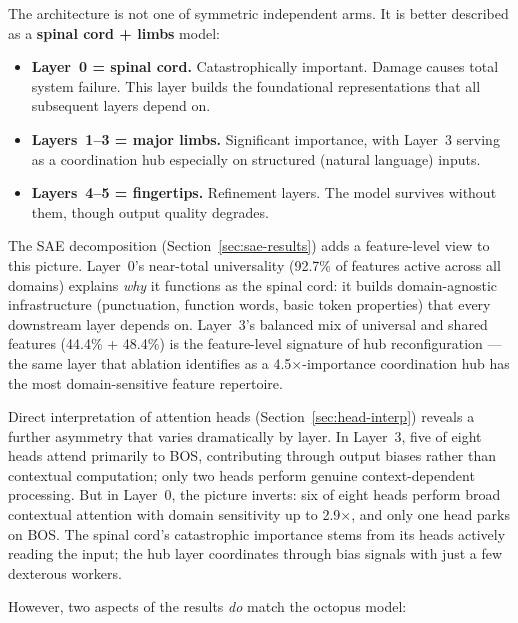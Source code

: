 \documentclass[11pt,a4paper]{article}
\begin{document}
The architecture is not one of symmetric independent arms.
It is better described as a \textbf{spinal cord + limbs} model:

\begin{itemize}[itemsep=2pt]
    \item \textbf{Layer~0 = spinal cord.} Catastrophically important. Damage causes total system failure. This layer builds the foundational representations that all subsequent layers depend on.
    \item \textbf{Layers~1--3 = major limbs.} Significant importance, with Layer~3 serving as a coordination hub especially on structured (natural language) inputs.
    \item \textbf{Layers~4--5 = fingertips.} Refinement layers. The model survives without them, though output quality degrades.
\end{itemize}

The SAE decomposition (Section~\ref{sec:sae-results}) adds a feature-level view to this picture.
Layer~0's near-total universality (92.7\% of features active across all domains) explains \emph{why} it functions as the spinal cord: it builds domain-agnostic infrastructure (punctuation, function words, basic token properties) that every downstream layer depends on.
Layer~3's balanced mix of universal and shared features (44.4\% + 48.4\%) is the feature-level signature of hub reconfiguration --- the same layer that ablation identifies as a 4.5$\times$-importance coordination hub has the most domain-sensitive feature repertoire.

Direct interpretation of attention heads (Section~\ref{sec:head-interp}) reveals a further asymmetry that varies dramatically by layer.
In Layer~3, five of eight heads attend primarily to BOS, contributing through output biases rather than contextual computation; only two heads perform genuine context-dependent processing.
But in Layer~0, the picture inverts: six of eight heads perform broad contextual attention with domain sensitivity up to 2.9$\times$, and only one head parks on BOS.
The spinal cord's catastrophic importance stems from its heads actively reading the input; the hub layer coordinates through bias signals with just a few dexterous workers.

However, two aspects of the results \emph{do} match the octopus model:
\end{document}
